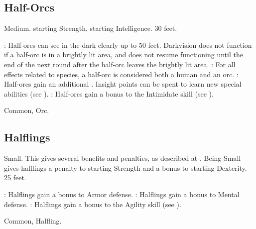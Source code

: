 \subsection{Half-Orcs}
 Medium.
  starting Strength,  starting Intelligence.
 30 feet.
\begin{itemize}
    : Half-orcs can see in the dark clearly up to 50 feet. Darkvision does not function if a half-orc is in a brightly lit area, and does not resume functioning until the end of the next round after the half-orc leaves the brightly lit area.
    : For all effects related to species, a half-orc is considered both a human and an orc.
    : Half-orcs gain an additional .
        Insight points can be spent to learn new special abilities (see ).
    : Half-orcs gain a  bonus to the Intimidate skill (see ).
\end{itemize}
 Common, Orc.

\subsection{Halflings}
 Small. This gives several benefits and penalties, as described at .
 Being Small gives halflings a  penalty to starting Strength and a  bonus to starting Dexterity.
 25 feet.
\begin{itemize}
    : Halflings gain a  bonus to Armor defense.
    : Halflings gain a  bonus to Mental defense.
    : Halflings gain a  bonus to the Agility skill (see ).
\end{itemize}
 Common, Halfling.
